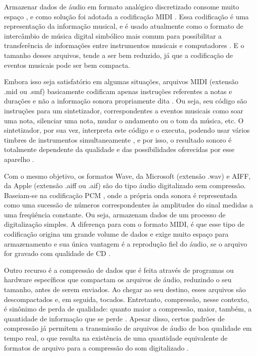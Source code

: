 Armazenar dados de áudio em formato analógico discretizado consome muito espaço \cite{juliana2004}, e como solução foi adotada a codificação MIDI . Essa codificação é uma representação da informação musical, e é usado atualmente como o formato de intercâmbio de música digital simbólico mais comum para possibilitar a transferência de informações entre instrumentos musicais e computadores \cite{muller2007}. E o tamanho desses arquivos, tende a ser bem reduzido, já que a codificação de eventos musicais pode ser bem compacta.

Embora isso seja satisfatório em algumas situações, arquivos MIDI (extensão .mid ou .smf) basicamente codificam apenas instruções referentes a notas e durações e não a informação sonora propriamente dita \cite{fernando&kon1998}. Ou seja, seu código são instruções para um sintetizador, correspondentes a eventos musicais como soar uma nota, silenciar uma nota, mudar o andamento ou o tom da música, etc. O sintetizador, por sua vez, interpreta este código e o executa, podendo usar vários timbres de instrumentos simultaneamente \cite{miletto2004}, e por isso, o resultado sonoro é totalmente dependente da qualidade e das possibilidades oferecidas por esse aparelho \cite{fernando&kon1998}.

Com o mesmo objetivo, os formatos Wave, da Microsoft (extensão .wav) e AIFF, da Apple (extensão .aiff ou .aif) são do tipo áudio digitalizado sem compressão. Baseiam-se na codificação PCM , onde a própria onda sonora é representada como uma sucessão de números correspondentes às amplitudes do sinal medidas a uma freqüência constante. Ou seja, armazenam dados de um processo de digitalização simples. A diferença para com o formato MIDI, é que esse tipo de codificação origina um grande volume de dados e exige muito espaço para armazenamento e sua única vantagem é a reprodução fiel do áudio, se o arquivo for gravado com qualidade de CD \cite{miletto2004}.

Outro recurso é a compressão de dados que é feita através de programas ou hardware específicos que compactam os arquivos de áudio, reduzindo o seu tamanho, antes de serem enviados. Ao chegar ao seu destino, esses arquivos são descompactados e, em seguida, tocados. Entretanto, compressão, nesse contexto, é sinônimo de perda de qualidade: quanto maior a compressão, maior, também, a quantidade de informação que se perde \cite{fernando&kon1998}. Apesar disso, certos padrões de compressão já permitem a transmissão de arquivos de áudio de boa qualidade em tempo real, o que resulta na existência de uma quantidade equivalente de formatos de arquivo para a compressão do som digitalizado \cite{miletto2004}.

